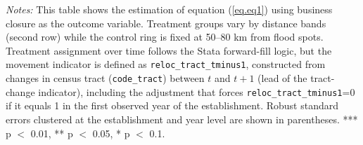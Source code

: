 \begin{table}[htb]
{\begin{threeparttable}
\begin{tabular}{lccccccccccccccc}
\bottomrule
    \end{tabular}%
        \begin{tablenotes}[flushleft] \item \small \textit{Notes:} This table shows the estimation of equation (\ref{eq.eq1}) using business closure as the outcome variable. Treatment groups vary by distance bands (second row) while the control ring is fixed at 50--80 km from flood spots. Treatment assignment over time follows the Stata forward-fill logic, but the movement indicator is defined as \texttt{reloc\_tract\_tminus1}, constructed from changes in census tract (\texttt{code\_tract}) between $t$ and $t+1$ (lead of the tract-change indicator), including the adjustment that forces \texttt{reloc\_tract\_tminus1}=0 if it equals 1 in the first observed year of the establishment. Robust standard errors clustered at the establishment and year level are shown in parentheses. *** p $<$ 0.01, ** p $<$ 0.05, * p $<$ 0.1.
        \end{tablenotes}
        \end{threeparttable}
        }
\end{table}%
